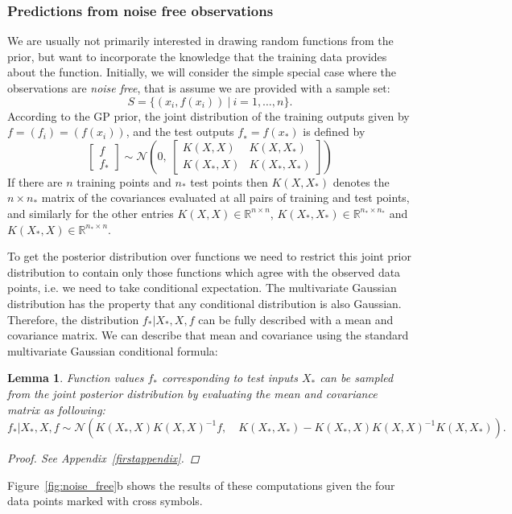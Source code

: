 \documentclass{article}[12pt]
\newtheorem{lemma}{Lemma}
\begin{document}
\subsubsection{Predictions from noise free observations}
We are usually not primarily interested in drawing random functions from the prior, but want to incorporate the knowledge that the training data provides about the function. 
Initially, we will consider the simple special case where the
observations are \textit{noise free}, that is assume we are provided with a sample set:
\begin{equation*}
S=\{(x_i,f(x_i))\ |\ i=1,\ldots,n\}.
\end{equation*}
According to the GP prior, the joint distribution of the training outputs given by $f=(f_i)=(f(x_i))$, and the test outputs $f_∗=f(x_*)$ is defined by
\begin{equation}
\label{eq:noise_free}
\begin{bmatrix}
f\\ f_*
\end{bmatrix} \sim
\mathcal{N}\left(0,\ 
\begin{bmatrix}
K(X,X) & K(X,X_*)\\
K(X_*,X) & K(X_*,X_*)
\end{bmatrix}\right)
\end{equation}
If there are $n$ training points and $n_*$ test points then $K(X, X_*)$ denotes the $n \times n_*$ matrix of the covariances evaluated at all pairs of training and test points, and similarly for the other entries $K(X, X)\in\mathbb{R}^{n\times n}$, $K(X_*, X_*)\in\mathbb{R}^{n_*\times n_*}$ and $K(X_*, X)\in\mathbb{R}^{n_*\times n}$.

To get the posterior distribution over functions we need to restrict this joint prior distribution to contain only those functions which agree with the observed data points, i.e. we need to take conditional expectation.
The multivariate Gaussian distribution has the property that any conditional distribution is also Gaussian. Therefore, the distribution $f_* |X_*, X, f$ can be fully described with a mean and covariance matrix.
We can describe that mean and covariance using the standard multivariate Gaussian conditional formula:
\begin{lemma}
	Function values $f_*$ corresponding to test inputs $X_*$ can be sampled from the
	joint posterior distribution by evaluating the mean and covariance matrix as following:
	\begin{equation}
	\label{eq:samp_free}
	f_*| X_*,X,f \sim \mathcal{N}\left(K(X_*,X)K(X,X)^{-1} f,\quad 
	K(X_*,X_*)-K(X_*,X)K(X,X)^{-1}K(X,X_*)\right).
	\end{equation}
	\begin{proof}
		See Appendix~\ref{firstappendix}.
	\end{proof}
\end{lemma}
Figure~\ref{fig:noise_free}b shows the results of these computations given the four data points marked with cross symbols.
\end{document}
